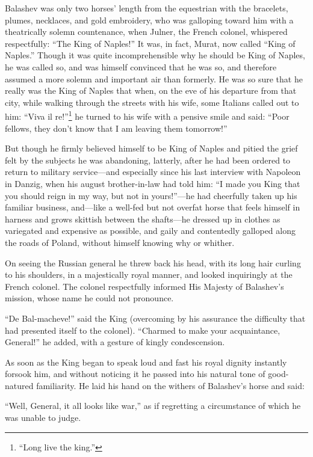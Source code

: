 Balashev was only two horses' length from the equestrian with the
bracelets, plumes, necklaces, and gold embroidery, who was
galloping toward him with a theatrically solemn countenance, when
Julner, the French colonel, whispered respectfully: ``The King of
Naples!'' It was, in fact, Murat, now called ``King of Naples.''
Though it was quite incomprehensible why he should be King of
Naples, he was called so, and was himself convinced that he was
so, and therefore assumed a more solemn and important air than
formerly. He was so sure that he really was the King of Naples
that when, on the eve of his departure from that city, while
walking through the streets with his wife, some Italians called
out to him: ``Viva il re!''\footnote{``Long live the king.''} he
turned to his wife with a pensive smile and said: ``Poor fellows,
they don't know that I am leaving them tomorrow!''

But though he firmly believed himself to be King of Naples and
pitied the grief felt by the subjects he was abandoning,
latterly, after he had been ordered to return to military
service---and especially since his last interview with Napoleon
in Danzig, when his august brother-in-law had told him: ``I made
you King that you should reign in my way, but not in
yours!''---he had cheerfully taken up his familiar business,
and---like a well-fed but not overfat horse that feels himself in
harness and grows skittish between the shafts---he dressed up in
clothes as variegated and expensive as possible, and gaily and
contentedly galloped along the roads of Poland, without himself
knowing why or whither.

On seeing the Russian general he threw back his head, with its
long hair curling to his shoulders, in a majestically royal
manner, and looked inquiringly at the French colonel. The colonel
respectfully informed His Majesty of Balashev's mission, whose
name he could not pronounce.

``De Bal-macheve!'' said the King (overcoming by his assurance
the difficulty that had presented itself to the
colonel). ``Charmed to make your acquaintance, General!'' he
added, with a gesture of kingly condescension.

As soon as the King began to speak loud and fast his royal
dignity instantly forsook him, and without noticing it he passed
into his natural tone of good-natured familiarity. He laid his
hand on the withers of Balashev's horse and said:

``Well, General, it all looks like war,'' as if regretting a
circumstance of which he was unable to judge.

